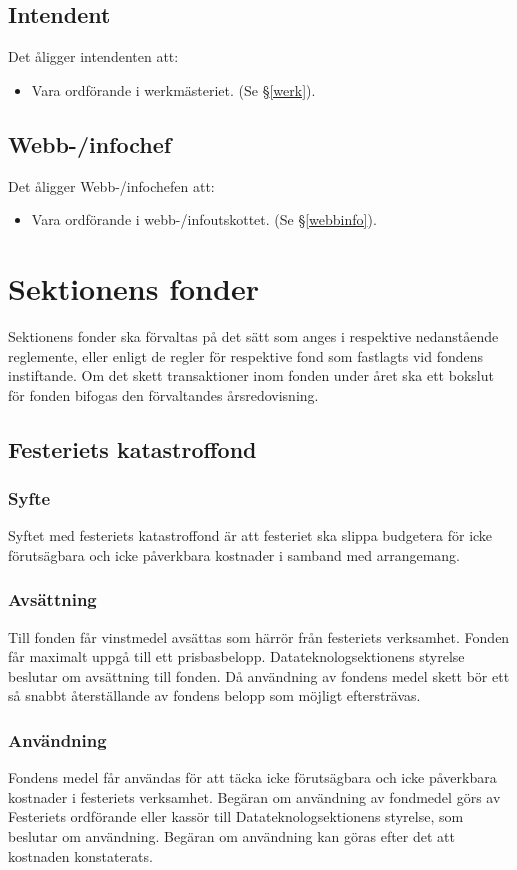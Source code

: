 \documentclass{datateknologsektionen-document}
\begin{document}
\subsection{Intendent}
\label{intendent}
Det åligger intendenten att:
\begin{itemize}
  \item Vara ordförande i werkmästeriet. (Se \S \ref{werk}).
\end{itemize}


\subsection{Webb-/infochef}
Det åligger Webb-/infochefen att:
\begin{itemize}
  \item Vara ordförande i webb-/infoutskottet. (Se \S \ref{webbinfo}).
\end{itemize}


\section{Sektionens fonder}
Sektionens fonder ska förvaltas på det sätt som anges i respektive nedanstående reglemente, eller
enligt de regler för respektive fond som fastlagts vid fondens instiftande. Om det skett
transaktioner inom fonden under året ska ett bokslut för fonden bifogas den förvaltandes
årsredovisning.
\subsection{Festeriets katastroffond}
\subsubsection{Syfte}
Syftet med festeriets katastroffond är att festeriet ska slippa budgetera för icke förutsägbara och
icke påverkbara kostnader i samband med arrangemang.
\subsubsection{Avsättning}
Till fonden får vinstmedel avsättas som härrör från festeriets verksamhet. Fonden får maximalt
uppgå till ett prisbasbelopp. Datateknologsektionens styrelse beslutar om avsättning till fonden.
Då användning av fondens medel skett bör ett så snabbt återställande av fondens belopp som
möjligt eftersträvas.
\subsubsection{Användning}
Fondens medel får användas för att täcka icke förutsägbara och icke påverkbara kostnader i
festeriets verksamhet. Begäran om användning av fondmedel görs av Festeriets ordförande eller
kassör till Datateknologsektionens styrelse, som beslutar om användning. Begäran om
användning kan göras efter det att kostnaden konstaterats.
\end{document}
